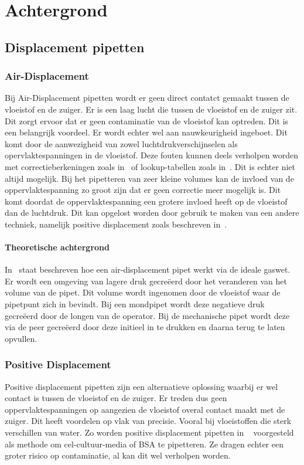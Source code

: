 \chapter{Achtergrond}


\section{Displacement pipetten}
\subsection{Air-Displacement}
Bij Air-Displacement pipetten wordt er geen direct contatct gemaakt tussen de vloeistof en de zuiger. Er is een laag lucht die tussen de vloeistof en de zuiger zit. Dit zorgt ervoor dat er geen contaminatie van de vloeistof kan optreden. Dit is een belangrijk voordeel. Er wordt echter wel aan nauwkeurigheid ingeboet. Dit komt door de aanwezigheid van zowel luchtdrukverschijnselen als opervlaktespanningen in de vloeistof. Deze fouten kunnen deels verholpen worden met correctieberkeningen zoals in\ \cite{RN15} of lookup-tabellen zoals in\ \cite{RN35}. Dit is echter niet altijd mogelijk. Bij het pipetteren van zeer kleine volumes kan de invloed van de oppervlaktespanning zo groot zijn dat er geen correctie meer mogelijk is. Dit komt doordat de oppervlaktespanning een grotere invloed heeft op de vloeistof dan de luchtdruk. Dit kan opgelost worden door gebruik te maken van een andere techniek, namelijk positive displacement zoals beschreven in\ \cite{RN15}.
\subsubsection{Theoretische achtergrond}
In\ \cite{RN15} staat beschreven hoe een air-displacement pipet werkt via de ideale gaswet. Er wordt een omgeving van lagere druk gecreëerd door het veranderen van het volume van de pipet. Dit volume wordt ingenomen door de vloeistof waar de pipetpunt zich in bevindt. Bij een mondpipet wordt deze negatieve druk gecreëerd door de longen van de operator. Bij de mechanische pipet wordt deze via de peer gecreëerd door deze initieel in te drukken en daarna terug te laten opvullen.
\subsection{Positive Displacement}
Positive displacement pipetten zijn een alternatieve oplossing waarbij er wel contact is tussen de vloeistof en de zuiger. Er treden dus geen oppervlaktespanningen op aangezien de vloeistof overal contact maakt met de zuiger. Dit heeft voordelen op vlak van precisie. Vooral bij vloeistoffen die sterk verschillen van water. Zo worden positive displacement pipetten in \ \cite{RN37} voorgesteld als methode om cel-cultuur-media of BSA te pipetteren. Ze dragen echter een groter risico op contaminatie, al kan dit wel verholpen worden.

